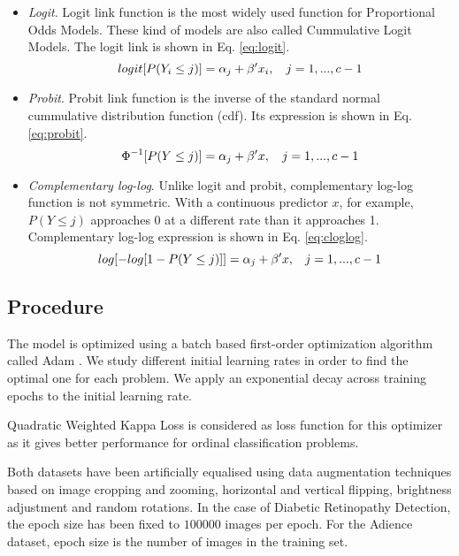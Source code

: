 \documentclass[10pt, a4paper, titlepage, twocolumn]{article}
\begin{document}
	\begin{itemize}
		\item \textit{Logit}. Logit link function is the most widely used function for Proportional Odds Models. These kind of models are also called Cummulative Logit Models. The logit link is shown in Eq. \ref{eq:logit}.
		\begin{equation}
		\small
		logit[P(Y_i \le j)] = \alpha_j + \beta'x_i,\quad j = 1, ..., c - 1
		\label{eq:logit}
		\end{equation}
		\item \textit{Probit}. Probit link function is the inverse of the standard normal cummulative distribution function (cdf). Its expression is shown in Eq. \ref{eq:probit}.	
		\begin{equation}
		\small
		\Phi^{-1}[P(Y \le j)] = \alpha_j + \beta'x,\quad j = 1, ..., c - 1
		\label{eq:probit}
		\end{equation}
		\item \textit{Complementary log-log}. Unlike logit and probit, complementary log-log function is not symmetric. With a continuous predictor $x$, for example, $P(Y \le j)$ approaches 0 at a different rate than it approaches 1. Complementary log-log expression is shown in Eq. \ref{eq:cloglog}.
		\begin{equation}
		\footnotesize
		log[-log[1 - P(Y \le j)]] = \alpha_j + \beta'x,\quad j = 1, ..., c - 1
		\label{eq:cloglog}
		\end{equation}
	\end{itemize}
	
	\subsection{Procedure}
	The model is optimized using a batch based first-order optimization algorithm called Adam \cite{kingma2014adam}. We study different initial learning rates in order to find the optimal one for each problem. We apply an exponential decay across training epochs to the initial learning rate.
	
	Quadratic Weighted Kappa Loss is considered as loss function for this optimizer as it gives better performance for ordinal classification problems.
	
	Both datasets have been artificially equalised using data augmentation techniques \cite{van2001art}\cite{krizhevsky2012imagenet} based on image cropping and zooming, horizontal and vertical flipping, brightness adjustment and random rotations. In the case of Diabetic Retinopathy Detection, the epoch size has been fixed to $100000$ images per epoch. For the Adience dataset, epoch size is the number of images in the training set.
	
\end{document}
